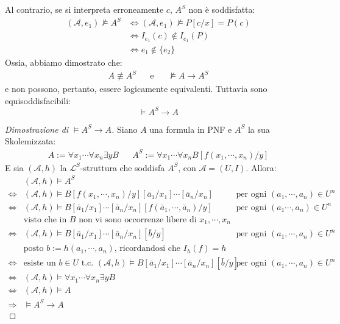 Al contrario, se si interpreta erroneamente $c$, $A^S$ non è soddisfatta: 
\begin{align*}
  (\mathscr{A}, e_1) \nvDash A^S &\iff (\mathscr{A}, e_1) \nvDash P[c/x] = P(c) \\
    &\iff I_{e_1}(c) \not\in I_{e_1}(P) \\
    &\iff e_1 \not\in \{e_2\}
\end{align*}
Ossia, abbiamo dimostrato che:
\begin{align*}
A \not\equiv A^S && \text{e} && \nvDash A \rightarrow A^S
\end{align*}
e non possono, pertanto, essere logicamente equivalenti. Tuttavia sono equisoddisfacibili: 
$$
\models A^S \rightarrow A
$$
\begin{proof}[Dimostrazione di $\models A^S \rightarrow A$]
Siano $A$ una formula in PNF e $A^S$ la sua Skolemizzata:
\begin{align*}
A := \forall x_1 \cdots \forall x_n \exists y B &&
A^S := \forall x_1 \cdots \forall x_n B[f(x_1, \cdots, x_n)/y]
\end{align*}
E sia $(\mathscr{A}, h)$ la $\mathscr{L}^S$-struttura che soddisfa $A^S$, con $\mathscr{A} = (U,I)$. Allora: 
\begin{align*}
& (\mathscr{A}, h) \models A^S \\
\iff & (\mathscr{A}, h) \models B[f(x_1, \cdots, x_n)/y][\bar a_1 / x_1] \cdots [\bar a_n / x_n] & \text{ per ogni } (a_1, \cdots, a_n) \in U^n\\
\iff & (\mathscr{A}, h) \models B[\bar a_1 / x_1]\cdots[\bar a_n / x_n][f(\bar a_1, \cdots , \bar a_n) / y] & \text{ per ogni } (a_1 \cdots, a_n) \in U^n \\
& \text{visto che in } B \text{ non vi sono occorrenze libere di } x_1, \cdots, x_n \\
\iff & (\mathscr{A}, h) \models B[\bar a_1 / x_1]\cdots[\bar a_n / x_n][\bar b / y] & \text{ per ogni } (a_1, \cdots, a_n) \in U^n \\
& \text{posto } b := h(a_1, \cdots, a_n) \text{, ricordandosi che } I_h(f) = h \\
\iff & \text{esiste un } b \in U \text{ t.c. } (\mathscr{A}, h) \models B[\bar a_1 / x_1]\cdots[\bar a_n / x_n][\bar b / y] & \text{ per ogni } (a_1, \cdots, a_n) \in U^n \\
\iff & (\mathscr{A}, h) \models \forall x_1 \cdots \forall x_n \exists y B \\
\iff & (\mathscr{A}, h) \models A\\
\Longrightarrow & \models A^S \rightarrow A
\end{align*}
\end{proof}

